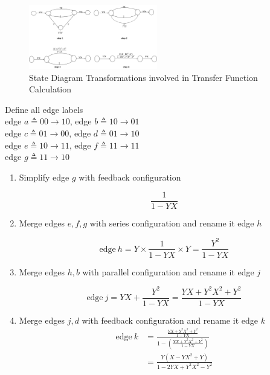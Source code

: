 \begin{figure}[h!]
\centering
		\includegraphics[width=0.5\textwidth]{tfexample.png}
		\caption{State Diagram Transformations involved in Transfer Function Calculation }
		\label{fig5}
		\end{figure}

\begin{example} Define all edge labels\\
\label{ex3}
 edge $ a\triangleq 0 0 \rightarrow 1 0$,  edge $b \triangleq 1 0 \rightarrow 0 1$\\
 edge $ c \triangleq 0 1 \rightarrow 0 0$, edge $d \triangleq 0 1 \rightarrow 1 0$\\
 edge $ e \triangleq 1 0 \rightarrow 1 1$, edge $f \triangleq 1 1 \rightarrow 1 1$\\
 edge $ g \triangleq 1 1 \rightarrow 1 0$

\begin{enumerate}
\item Simplify edge $g$ with feedback configuration

$$ \frac{1}{1-YX}$$

\item Merge edges $e,f,g$ with series configuration and rename it edge $h$

$$\text{edge}~h = Y\times \frac{1}{1-YX}\times Y=\frac{Y^2}{1-YX}$$

\item Merge edges $h,b$ with parallel configuration and rename it edge $j$

$$\text{edge}~j = YX+ \frac{Y^2}{1-YX}= \frac{YX+Y^2X^2+Y^2}{1-YX}$$

\item Merge  edges $j,d$ with feedback configuration and rename it edge $k$ 
\begin{equation*}
\begin{split}
 \text{edge}~k&= \frac{\frac{YX+Y^2X^2+Y^2}{1-YX}}{1-(\frac{YX+Y^2X^2+Y^2}{1-YX})}\\
 &=\frac{Y(X-YX^2+Y)}{1-2YX+Y^2X^2-Y^2}
\end{split}
\end{equation*}


\end{enumerate}
\end{example}
